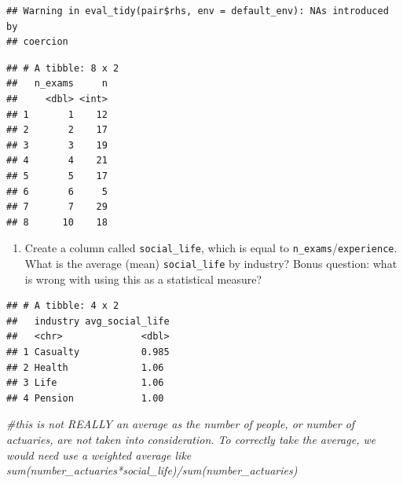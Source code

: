\documentclass[]{book}
\newenvironment{Shaded}{\begin{snugshade}}{\end{snugshade}}
\newcommand{\CommentTok}[1]{\textcolor[rgb]{0.56,0.35,0.01}{\textit{#1}}}
\newcommand{\DataTypeTok}[1]{\textcolor[rgb]{0.13,0.29,0.53}{#1}}
\newcommand{\KeywordTok}[1]{\textcolor[rgb]{0.13,0.29,0.53}{\textbf{#1}}}
\newcommand{\NormalTok}[1]{#1}
\newcommand{\OperatorTok}[1]{\textcolor[rgb]{0.81,0.36,0.00}{\textbf{#1}}}
\newcommand{\StringTok}[1]{\textcolor[rgb]{0.31,0.60,0.02}{#1}}
\providecommand{\tightlist}{%
  \setlength{\itemsep}{0pt}\setlength{\parskip}{0pt}}
\begin{document}
\begin{verbatim}
## Warning in eval_tidy(pair$rhs, env = default_env): NAs introduced by
## coercion
\end{verbatim}

\begin{Shaded}
\end{Shaded}

\begin{verbatim}
## # A tibble: 8 x 2
##   n_exams     n
##     <dbl> <int>
## 1       1    12
## 2       2    17
## 3       3    19
## 4       4    21
## 5       5    17
## 6       6     5
## 7       7    29
## 8      10    18
\end{verbatim}

\begin{enumerate}
\def\labelenumi{\arabic{enumi}.}
\setcounter{enumi}{7}
\tightlist
\item
  Create a column called \texttt{social\_life}, which is equal to \texttt{n\_exams}/\texttt{experience}. What is the average (mean) \texttt{social\_life} by industry? Bonus question: what is wrong with using this as a statistical measure?
\end{enumerate}

\begin{Shaded}
\end{Shaded}

\begin{verbatim}
## # A tibble: 4 x 2
##   industry avg_social_life
##   <chr>              <dbl>
## 1 Casualty           0.985
## 2 Health             1.06 
## 3 Life               1.06 
## 4 Pension            1.00
\end{verbatim}

\begin{Shaded}
\begin{Highlighting}[]
\CommentTok{#this is not REALLY an average as the number of people, or number of actuaries, are not taken into consideration.  To correctly take the average, we would need use a weighted average like sum(number_actuaries*social_life)/sum(number_actuaries)}
\end{Highlighting}
\end{Shaded}
\end{document}
